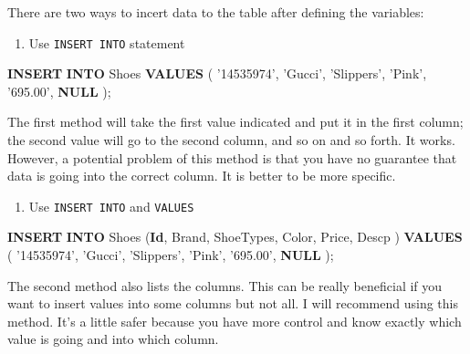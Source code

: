 \documentclass[]{book}
\newenvironment{Shaded}{\begin{snugshade}}{\end{snugshade}}
\newcommand{\KeywordTok}[1]{\textcolor[rgb]{0.13,0.29,0.53}{\textbf{{#1}}}}
\newcommand{\StringTok}[1]{\textcolor[rgb]{0.31,0.60,0.02}{{#1}}}
\newcommand{\NormalTok}[1]{{#1}}
\providecommand{\tightlist}{%
  \setlength{\itemsep}{0pt}\setlength{\parskip}{0pt}}
\theoremstyle{definition}
\theoremstyle{definition}
\theoremstyle{remark}
\begin{document}
There are two ways to incert data to the table after defining the
variables:

\begin{enumerate}
\def\labelenumi{(\arabic{enumi})}
\tightlist
\item
  Use \texttt{INSERT\ INTO} statement
\end{enumerate}

\begin{Shaded}
\begin{Highlighting}[]
\KeywordTok{INSERT} \KeywordTok{INTO} \NormalTok{Shoes}
\KeywordTok{VALUES} \NormalTok{( }\StringTok{'14535974'}\NormalTok{,}
\StringTok{'Gucci'}\NormalTok{,}
\StringTok{'Slippers'}\NormalTok{,}
\StringTok{'Pink'}\NormalTok{,}
\StringTok{'695.00'}\NormalTok{,}
\KeywordTok{NULL}
\NormalTok{);}
\end{Highlighting}
\end{Shaded}

The first method will take the first value indicated and put it in the
first column; the second value will go to the second column, and so on
and so forth. It works. However, a potential problem of this method is
that you have no guarantee that data is going into the correct column.
It is better to be more specific.

\begin{enumerate}
\def\labelenumi{(\arabic{enumi})}
\setcounter{enumi}{1}
\tightlist
\item
  Use \texttt{INSERT\ INTO} and \texttt{VALUES}
\end{enumerate}

\begin{Shaded}
\begin{Highlighting}[]
\KeywordTok{INSERT} \KeywordTok{INTO} \NormalTok{Shoes}
\NormalTok{(}\KeywordTok{Id}\NormalTok{, }
\NormalTok{Brand,}
\NormalTok{ShoeTypes,}
\NormalTok{Color,}
\NormalTok{Price,}
\NormalTok{Descp}
\NormalTok{)}
\KeywordTok{VALUES} 
\NormalTok{( }
\StringTok{'14535974'}\NormalTok{,}
\StringTok{'Gucci'}\NormalTok{,}
\StringTok{'Slippers'}\NormalTok{,}
\StringTok{'Pink'}\NormalTok{,}
\StringTok{'695.00'}\NormalTok{,}
\KeywordTok{NULL}
\NormalTok{);}
\end{Highlighting}
\end{Shaded}

The second method also lists the columns. This can be really beneficial
if you want to insert values into some columns but not all. I will
recommend using this method. It's a little safer because you have more
control and know exactly which value is going and into which column.
\end{document}
